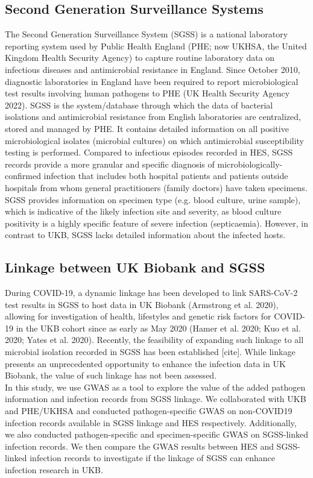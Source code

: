\documentclass{article}
\begin{document}
\subsection{Second Generation Surveillance Systems}
The Second Generation Surveillance System (SGSS) is a national laboratory reporting system used by Public Health England (PHE; now UKHSA, the United Kingdom Health Security Agency) to capture routine laboratory data on infectious diseases and antimicrobial resistance in England. Since October 2010, diagnostic laboratories in England have been required to report microbiological test results involving human pathogens to PHE (UK Health Security Agency 2022). SGSS is the system/database through which the data of bacterial isolations and antimicrobial resistance from English laboratories are centralized, stored and managed by PHE. It contains detailed information on all positive microbiological isolates (microbial cultures) on which antimicrobial susceptibility testing is performed. Compared to infectious episodes recorded in HES, SGSS records provide a more granular and specific diagnosis of microbiologically-confirmed infection that includes both hospital patients and patients outside hospitals from whom general practitioners (family doctors) have taken specimens. SGSS provides information on specimen type (e.g. blood culture, urine sample), which is indicative of the likely infection site and severity, as blood culture positivity is a highly specific feature of severe infection (septicaemia). However, in contrast to UKB, SGSS lacks detailed information about the infected hosts.

\subsection{Linkage between UK Biobank and SGSS}
During COVID-19, a dynamic linkage has been developed to link SARS-CoV-2 test results in SGSS to host data in UK Biobank (Armstrong et al. 2020), allowing for investigation of health, lifestyles and genetic risk factors for COVID-19 in the UKB cohort since as early as May 2020 (Hamer et al. 2020; Kuo et al. 2020; Yates et al. 2020). Recently, the feasibility of expanding such linkage to all microbial isolation recorded in SGSS has been established [cite]. While linkage presents an unprecedented opportunity to enhance the infection data in UK Biobank, the value of such linkage has not been assessed.
\\
In this study, we use GWAS as a tool to explore the value of the added pathogen information and infection records from SGSS linkage. We collaborated with UKB and PHE/UKHSA and conducted pathogen-specific GWAS on non-COVID19 infection records available in SGSS linkage and HES respectively. Additionally, we also conducted pathogen-specific and specimen-specific GWAS on SGSS-linked infection records. We then compare the GWAS results between HES and SGSS-linked infection records to investigate if the linkage of SGSS can enhance infection research in UKB.
\end{document}

